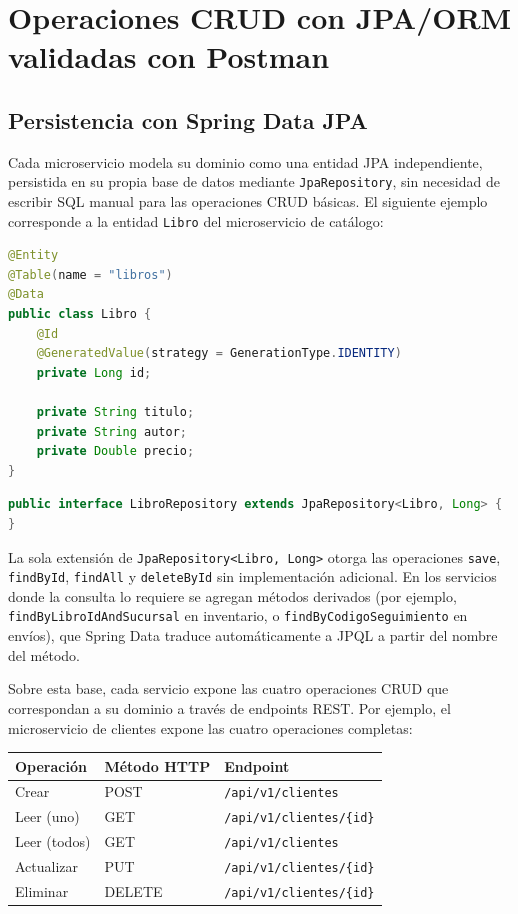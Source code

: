 \chapter{Operaciones CRUD con JPA/ORM validadas con Postman}
\label{ch:crud}

\section{Persistencia con Spring Data JPA}

Cada microservicio modela su dominio como una entidad JPA independiente, persistida en
su propia base de datos mediante \texttt{JpaRepository}, sin necesidad de escribir SQL
manual para las operaciones CRUD básicas. El siguiente ejemplo corresponde a la entidad
\texttt{Libro} del microservicio de catálogo:

\begin{lstlisting}[language=Java, caption={Libro.java -- entidad JPA de catálogo}]
@Entity
@Table(name = "libros")
@Data
public class Libro {
    @Id
    @GeneratedValue(strategy = GenerationType.IDENTITY)
    private Long id;

    private String titulo;
    private String autor;
    private Double precio;
}
\end{lstlisting}

\begin{lstlisting}[language=Java, caption={LibroRepository.java -- repositorio}]
public interface LibroRepository extends JpaRepository<Libro, Long> {
}
\end{lstlisting}

La sola extensión de \texttt{JpaRepository<Libro, Long>} otorga las operaciones
\texttt{save}, \texttt{findById}, \texttt{findAll} y \texttt{deleteById} sin
implementación adicional. En los servicios donde la consulta lo requiere se agregan
métodos derivados (por ejemplo, \texttt{findByLibroIdAndSucursal} en inventario, o
\texttt{findByCodigoSeguimiento} en envíos), que Spring Data traduce automáticamente a
JPQL a partir del nombre del método.

Sobre esta base, cada servicio expone las cuatro operaciones CRUD que correspondan a su
dominio a través de endpoints REST. Por ejemplo, el microservicio de clientes expone
las cuatro operaciones completas:

\begin{center}
\begin{tabular}{lll}
\toprule
\textbf{Operación} & \textbf{Método HTTP} & \textbf{Endpoint} \\
\midrule
Crear & POST & \texttt{/api/v1/clientes} \\
Leer (uno) & GET & \texttt{/api/v1/clientes/\{id\}} \\
Leer (todos) & GET & \texttt{/api/v1/clientes} \\
Actualizar & PUT & \texttt{/api/v1/clientes/\{id\}} \\
Eliminar & DELETE & \texttt{/api/v1/clientes/\{id\}} \\
\bottomrule
\end{tabular}
\end{center}

